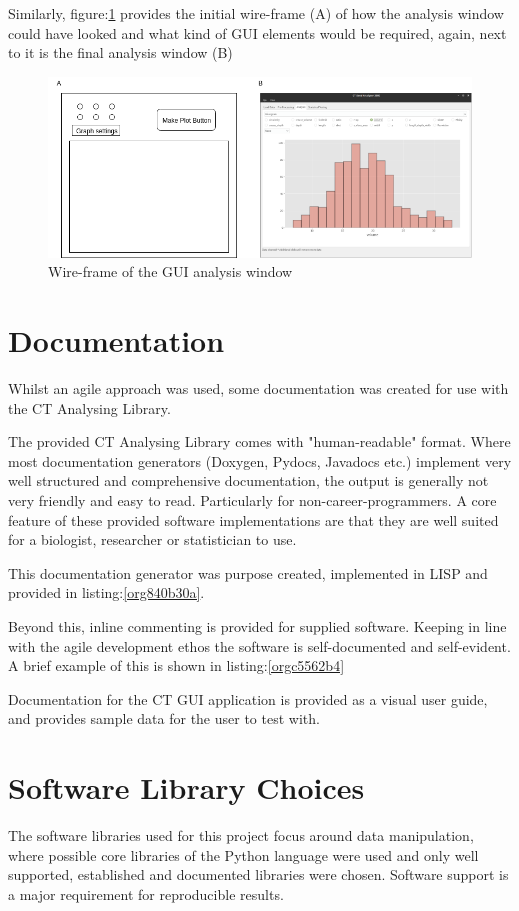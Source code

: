 \documentclass[11pt]{report}
\begin{document}
Similarly, figure:\ref{fig:org1c85053} provides the initial wire-frame (A) of how the analysis window could have looked and what kind of GUI elements would be required, again, next to it is the final analysis window (B)
\begin{figure}[htbp]
\centering
\includegraphics[width=16cm]{./images/wireframe2.png}
\caption{\label{fig:org1c85053}
Wire-frame of the GUI analysis window}
\end{figure}
\section{Documentation}
\label{sec:org7c3eb26}
Whilst an agile approach was used, some documentation was created for use with the CT Analysing Library.

The provided CT Analysing Library comes with "human-readable" format. Where most documentation generators (Doxygen, Pydocs, Javadocs etc.) implement very well structured and comprehensive documentation, the output is generally not very friendly and easy to read. Particularly for non-career-programmers. A core feature of these provided software implementations are that they are well suited for a biologist, researcher or statistician to use.

This documentation generator was purpose created, implemented in LISP and provided in listing:\ref{org840b30a}.

Beyond this, inline commenting is provided for supplied software. Keeping in line with the agile development ethos the software is self-documented and self-evident. A brief example of this is shown in listing:\ref{orgc5562b4}

Documentation for the CT GUI application is provided as a visual user guide, and provides sample data for the user to test with.
\section{Software Library Choices}
\label{sec:org2db3af4}
The software libraries used for this project focus around data manipulation, where possible core libraries of the Python language were used and only well supported, established and documented libraries were chosen. Software support is a major requirement for reproducible results.
\end{document}
